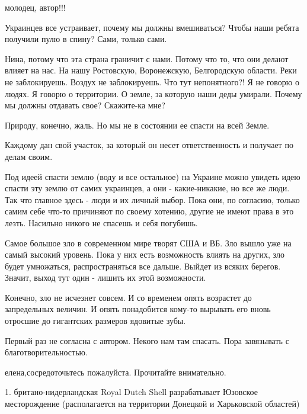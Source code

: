 \begin{itemize}

молодец, автор!!!


Украинцев все устраивает, почему мы должны вмешиваться? Чтобы наши ребята
получили пулю в спину? Сами, только сами.

\begin{itemize} %

Нина, потому что эта страна граничит с нами. Потому что то, что они делают
влияет на нас. На нашу Ростовскую, Воронежскую, Белгородскую области. Реки не
заблокируешь. Воздух не заблокируешь. Что тут непонятного?! Я не говорю о
людях. Я говорю о территории. О земле, за которую наши деды умирали. Почему мы
должны отдавать свое? Скажите-ка мне?
\end{itemize} %


Природу, конечно, жаль. Но мы не в состоянии ее спасти на всей Земле.

Каждому дан свой участок, за который он несет ответственность и получает по
делам своим.

Под идеей спасти землю (воду и все остальное) на Украине можно увидеть идею
спасти эту землю от самих украинцев, а они - какие-никакие, но все же люди. Так
что главное здесь - люди и их личный выбор. Пока они, по согласию, только самим
себе что-то причиняют по своему хотению, другие не имеют права в это лезть.
Насильно никого не спасешь и себя погубишь.

Самое большое зло в современном мире творят США и ВБ. Зло вышло уже на самый
высокий уровень. Пока у них есть возможность влиять на других, зло будет
умножаться, распространяться все дальше. Выйдет из всяких берегов. Значит,
выход тут один - лишить их этой возможности.

Конечно, зло не исчезнет совсем. И со временем опять возрастет до запредельных
величин. И опять понадобится кому-то вырывать его вновь отросшие до гигантских
размеров ядовитые зубы.


Первый раз не согласна с автором. Некого нам там спасать. Пора завязывать с
благотворительностью.

\begin{itemize} %

елена,сосредоточьтесь пожалуйста. Прочитайте внимательно.

1. британо-нидерландская Royal Dutch Shell разрабатывает Юзовское месторождение
(располагается на территории Донецкой и Харьковской областей)


\end{itemize}
\end{itemize}
